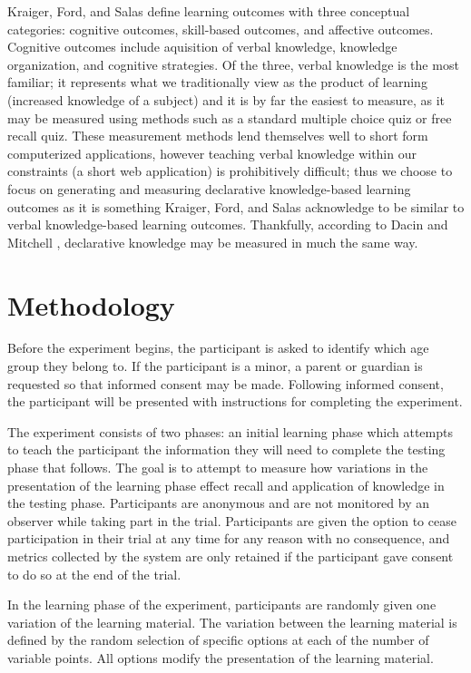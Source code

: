 \documentclass[12pt]{report}
\begin{document}
Kraiger, Ford, and Salas \cite{kraiger1993application} define learning outcomes with three conceptual categories: cognitive outcomes, skill-based outcomes, and affective outcomes. Cognitive outcomes include aquisition of verbal knowledge, knowledge organization, and cognitive strategies. Of the three, verbal knowledge is the most familiar; it represents what we traditionally view as the product of learning (increased knowledge of a subject) and it is by far the easiest to measure, as it may be measured using methods such as a standard multiple choice quiz or free recall quiz. These measurement methods lend themselves well to short form computerized applications, however teaching verbal knowledge within our constraints (a short web application) is prohibitively difficult; thus we choose to focus on generating and measuring declarative knowledge-based learning outcomes as it is something Kraiger, Ford, and Salas acknowledge to be similar to verbal knowledge-based learning outcomes. Thankfully, according to Dacin and Mitchell \cite{dacin1986measurement}, declarative knowledge may be measured in much the same way.

\chapter{Methodology}
\label{ch:Methodology}

Before the experiment begins, the participant is asked to identify which age group they belong to. If the participant is a minor, a parent or guardian is requested so that informed consent may be made. Following informed consent, the participant will be presented with instructions for completing the experiment.

The experiment consists of two phases: an initial learning phase which attempts to teach the participant the information they will need to complete the testing phase that follows. The goal is to attempt to measure how variations in the presentation of the learning phase effect recall and application of knowledge in the testing phase. Participants are anonymous and are not monitored by an observer while taking part in the trial. Participants are given the option to cease participation in their trial at any time for any reason with no consequence, and metrics collected by the system are only retained if the participant gave consent to do so at the end of the trial.

In the learning phase of the experiment, participants are randomly given one variation of the learning material. The variation between the learning material is defined by the random selection of specific options at each of the number of variable points. All options modify the presentation of the learning material.
\end{document}
